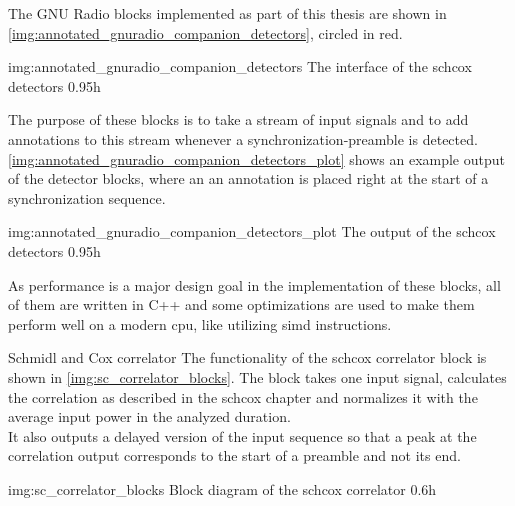 The GNU Radio blocks implemented as part of this thesis are
shown in \autoref{img:annotated_gnuradio_companion_detectors},
circled in red.

             {img:annotated_gnuradio_companion_detectors}
             {The interface of the \gls{schcox} detectors}
             {0.95}{h}

The purpose of these blocks is to take a stream of input signals
and to add annotations to this stream whenever a synchronization-preamble
is detected.
\autoref{img:annotated_gnuradio_companion_detectors_plot} shows an example output
of the detector blocks, where an an annotation is placed right at the start of a
synchronization sequence.

             {img:annotated_gnuradio_companion_detectors_plot}
             {The output of the \gls{schcox} detectors}
             {0.95}{h}

As performance is a major design goal in the implementation of these blocks,
all of them are written in C++ and some optimizations are used to make them
perform well on a modern \acrshort{cpu}, like utilizing
\acrshort{simd} instructions.

\begin{subchapter}{Schmidl and Cox correlator}
  The functionality of the \acrlong{schcox} correlator
  block is shown in \autoref{img:sc_correlator_blocks}.
  The block takes one input signal, calculates the correlation
  as described in the \acrlong{schcox} chapter and normalizes it
  with the average input power in the analyzed duration. \\

  It also outputs a delayed version of the input sequence so that
  a peak at the correlation output corresponds to the start of a
  preamble and not its end.

               {img:sc_correlator_blocks}
               {Block diagram of the \acrlong{schcox} correlator}
               {0.6}{h}
\end{subchapter}

